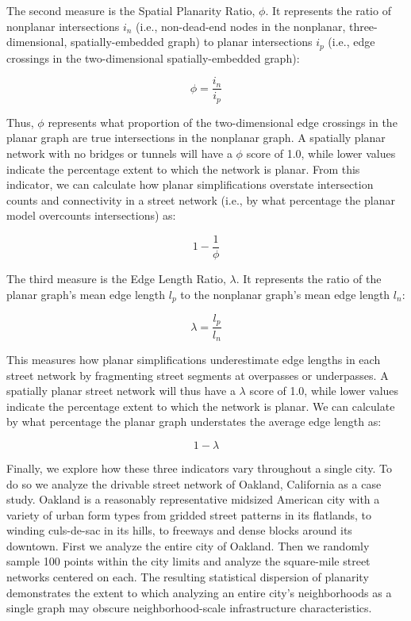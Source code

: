 \documentclass[Afour,sageh,times]{sagej}
\begin{document}
The second measure is the Spatial Planarity Ratio, $\phi$. It represents the ratio of nonplanar intersections $i_n$ (i.e., non-dead-end nodes in the nonplanar, three-dimensional, spatially-embedded graph) to planar intersections $i_p$ (i.e., edge crossings in the two-dimensional spatially-embedded graph): 

\begin{equation}
	\label{eq:spr}
	\phi = \frac{i_n}{i_p}
\end{equation}

Thus, $\phi$ represents what proportion of the two-dimensional edge crossings in the planar graph are true intersections in the nonplanar graph. A spatially planar network with no bridges or tunnels will have a $\phi$ score of 1.0, while lower values indicate the percentage extent to which the network is planar. From this indicator, we can calculate how planar simplifications overstate intersection counts and connectivity in a street network (i.e., by what percentage the planar model overcounts intersections) as:

\begin{equation}
	\label{eq:spr_overstates}
	1 - \frac{1}{\phi}
\end{equation}

The third measure is the Edge Length Ratio, $\lambda$. It represents the ratio of the planar graph's mean edge length $l_p$ to the nonplanar graph's mean edge length $l_n$:

\begin{equation}
	\label{eq:elr}
	\lambda = \frac{l_p}{l_n}
\end{equation}

This measures how planar simplifications underestimate edge lengths in each street network by fragmenting street segments at overpasses or underpasses. A spatially planar street network will thus have a $\lambda$ score of 1.0, while lower values indicate the percentage extent to which the network is planar. We can calculate by what percentage the planar graph understates the average edge length as:

\begin{equation}
	\label{eq:elr_understates}
	1 - \lambda
\end{equation}

Finally, we explore how these three indicators vary throughout a single city. To do so we analyze the drivable street network of Oakland, California as a case study. Oakland is a reasonably representative midsized American city with a variety of urban form types from gridded street patterns in its flatlands, to winding culs-de-sac in its hills, to freeways and dense blocks around its downtown. First we analyze the entire city of Oakland. Then we randomly sample 100 points within the city limits and analyze the square-mile street networks centered on each. The resulting statistical dispersion of planarity demonstrates the extent to which analyzing an entire city's neighborhoods as a single graph may obscure neighborhood-scale infrastructure characteristics.
\end{document}
